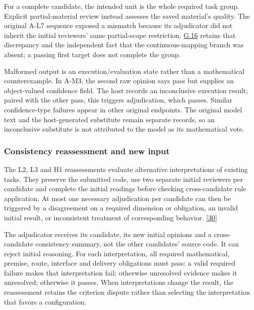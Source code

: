 For a complete candidate, the intended unit is the whole required task group. Explicit partial-material review instead assesses the saved material's quality. The original A-L7 sequence exposed a mismatch because its adjudicator did not inherit the initial reviewers' same partial-scope restriction. \hyperlink{g16}{G.16} retains that discrepancy and the independent fact that the continuous-mapping branch was absent; a passing first target does not complete the group.

Malformed output is an execution/evaluation state rather than a mathematical counterexample. In A-M3, the second raw opinion says pass but supplies an object-valued confidence field. The host records an inconclusive execution result; paired with the other pass, this triggers adjudication, which passes. Similar confidence-type failures appear in other original endpoints. The original model text and the host-generated substitute remain separate records, so an inconclusive substitute is not attributed to the model as its mathematical vote.

\subsubsection[Consistency reassessment and new input]{\texorpdfstring{\protect\hypertarget{n6-3}{}Consistency reassessment and new input}{Consistency reassessment and new input}}
The L2, L3 and H1 reassessments evaluate alternative interpretations of existing tasks. They preserve the submitted code, use two separate initial reviewers per candidate and complete the initial readings before checking cross-candidate rule application. At most one necessary adjudication per candidate can then be triggered by a disagreement on a required dimension or obligation, an invalid initial result, or inconsistent treatment of corresponding behavior. \href{en.pdf\#ref-30}{\mbox{[30]}}

The adjudicator receives its candidate, its new initial opinions and a cross-candidate consistency summary, not the other candidates' source code. It can reject initial reasoning. For each interpretation, all required mathematical, premise, route, interface and delivery obligations must pass: a valid required failure makes that interpretation fail; otherwise unresolved evidence makes it unresolved; otherwise it passes. When interpretations change the result, the reassessment retains the criterion dispute rather than selecting the interpretation that favors a configuration.

